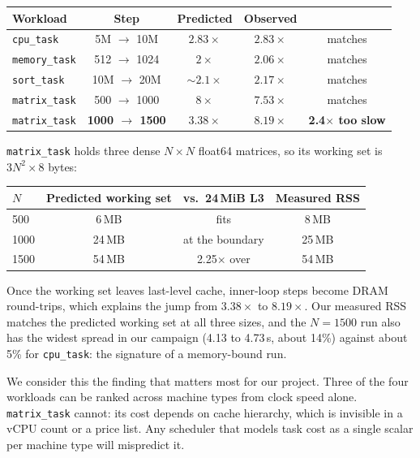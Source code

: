 \documentclass[11pt]{article}
\newcommand{\code}[1]{\texttt{#1}}
\begin{document}
\begin{center}
\begin{tabular}{lcccc}
\toprule
Workload & Step & Predicted & Observed & \\
\midrule
\code{cpu\_task}    & 5M $\to$ 10M   & $2.83\times$ & $2.83\times$ & matches \\
\code{memory\_task} & 512 $\to$ 1024 & $2\times$    & $2.06\times$ & matches \\
\code{sort\_task}   & 10M $\to$ 20M  & $\sim\!2.1\times$ & $2.17\times$ & matches \\
\code{matrix\_task} & 500 $\to$ 1000 & $8\times$    & $7.53\times$ & matches \\
\code{matrix\_task} & \textbf{1000 $\to$ 1500} & \textbf{$3.38\times$} & \textbf{$8.19\times$} &
\textbf{2.4$\times$ too slow} \\
\bottomrule
\end{tabular}
\end{center}

\code{matrix\_task} holds three dense $N \times N$ float64 matrices, so its working set is
$3N^2 \times 8$ bytes:

\begin{center}
\begin{tabular}{lccc}
\toprule
$N$ & Predicted working set & vs.\ 24\,MiB L3 & Measured RSS \\
\midrule
500  & 6\,MB  & fits             & 8\,MB \\
1000 & 24\,MB & at the boundary  & 25\,MB \\
1500 & 54\,MB & 2.25$\times$ over & 54\,MB \\
\bottomrule
\end{tabular}
\end{center}

Once the working set leaves last-level cache, inner-loop steps become DRAM round-trips, which
explains the jump from $3.38\times$ to $8.19\times$. Our measured RSS matches the predicted
working set at all three sizes, and the $N=1500$ run also has the widest spread in our campaign
(4.13 to 4.73\,s, about 14\%) against about 5\% for \code{cpu\_task}: the signature of a
memory-bound run.

We consider this the finding that matters most for our project. Three of the four workloads can be
ranked across machine types from clock speed alone. \code{matrix\_task} cannot: its cost depends
on cache hierarchy, which is invisible in a vCPU count or a price list. Any scheduler that models
task cost as a single scalar per machine type will mispredict it.
\end{document}
